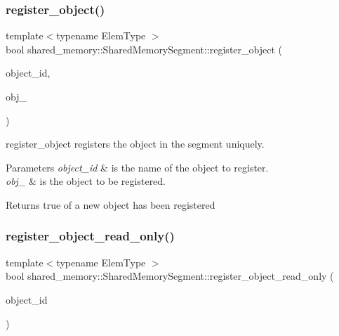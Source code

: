 \subsubsection{\texorpdfstring{register\+\_\+object()}{register\_object()}}
{\footnotesize\ttfamily template$<$typename Elem\+Type $>$ \\
bool shared\+\_\+memory\+::\+Shared\+Memory\+Segment\+::register\+\_\+object (\begin{DoxyParamCaption}\item[{const std\+::string \&}]{object\+\_\+id,  }\item[{const std\+::pair$<$ Elem\+Type $\ast$, std\+::size\+\_\+t $>$ \&}]{obj\+\_\+ }\end{DoxyParamCaption})}



register\+\_\+object registers the object in the segment uniquely. 


\begin{DoxyParams}{Parameters}
{\em object\+\_\+id} & is the name of the object to register. \\
\hline
{\em obj\+\_\+} & is the object to be registered. \\
\hline
\end{DoxyParams}
\begin{DoxyReturn}{Returns}
true of a new object has been registered 
\end{DoxyReturn}
\mbox{\label{classshared__memory_1_1SharedMemorySegment_a830fee375b183642b999f6a64240f280}} 
\subsubsection{\texorpdfstring{register\+\_\+object\+\_\+read\+\_\+only()}{register\_object\_read\_only()}}
{\footnotesize\ttfamily template$<$typename Elem\+Type $>$ \\
bool shared\+\_\+memory\+::\+Shared\+Memory\+Segment\+::register\+\_\+object\+\_\+read\+\_\+only (\begin{DoxyParamCaption}\item[{const std\+::string \&}]{object\+\_\+id }\end{DoxyParamCaption})}



